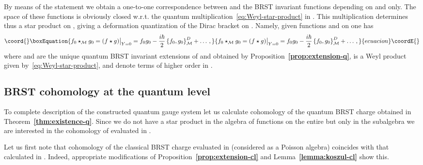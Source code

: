 \documentclass[a4paper,11pt]{amsart}
\numberwithin{thm}{section} %
\numberwithin{equation}{section} %
\numberwithin{figure}{section} %
\providecommand{\bref}[1]{{\bf \ref{#1}}}
\providecommand{\pb}[2]{\left\{{}#1{},{}#2{}\right\}}
\renewcommand{\:}{{\rm\, :\,}}
\providecommand{\func}[1]{{{\mathcal C}^\infty}{(#1)}}             %
\def\tensor{\otimes}
\def\cF{{\mathcal F}}
\def\manM{{\mathcal M}}
\def\qA{{\hat{\mathfrak A}}}
\def\E{{ \mathcal E}}
\begin{document}
By means of the statement we obtain a one-to-one correspondence
between \myHighlight{$\func{\manM}\tensor[[\hbar]]$}\coordHE{} and the BRST invariant
functions depending on \coordHE{} and \myHighlight{$\hbar$}\coordHE{} only. The space
of these functions is obviously closed w.r.t. the quantum
multiplication~\eqref{eq:Weyl-star-product} in \myHighlight{$\qA_0$}\coordHE{}. This
multiplication determines thus a star product on \myHighlight{$\manM$}\coordHE{}, giving a
deformation quantization of the Dirac bracket on \myHighlight{$\manM$}\coordHE{}.  Namely, given
functions \coordHE{} and \coordHE{} on \myHighlight{$\manM$}\coordHE{} one has
\begin{equation}\coord{}\boxEquation{
  f_0\star_{\manM} g_0=(f \star g){\bigr|}_{Y=0}=
f_0 g_0-\frac{i\hbar}{2}\pb{f_0}{g_0}^D_{\manM}+\ldots\,,
}{
  f_0\star_{\manM} g_0=(f \star g){\bigr|}_{Y=0}=
f_0 g_0-\frac{i\hbar}{2}\pb{f_0}{g_0}^D_{\manM}+\ldots\,,
}{ecuacion}\coordE{}\end{equation}
where \coordHE{} and \coordHE{} are the unique quantum
BRST invariant extensions of \coordHE{} and \coordHE{} obtained by
Proposition~\bref{prop:extension-q}, \myHighlight{$\star$}\coordHE{} is a Weyl product given
by~\eqref{eq:Weyl-star-product}, and \myHighlight{$\ldots$}\coordHE{} denote terms of higher
order in \myHighlight{$\hbar$}\coordHE{}.


\subsection{BRST cohomology at the quantum level}\label{subsec:BRST-q}
To complete description of the constructed quantum gauge system
let us calculate cohomology of the quantum BRST charge obtained in
Theorem~\bref{thm:existence-q}.  Since we do not have
a star product in the algebra \myHighlight{$\cF(\E)$}\coordHE{} of functions on
the entire \myHighlight{$\E$}\coordHE{} but only in the subalgebra \myHighlight{$\qA$}\coordHE{} we are interested
in the cohomology of \myHighlight{$\hat\Omega$}\coordHE{} evaluated in \myHighlight{$\qA$}\coordHE{}.

Let us first note that cohomology of the classical BRST charge
\myHighlight{$\Omega$}\coordHE{} evaluated in \myHighlight{$\qA$}\coordHE{} (considered as a Poisson algebra)
coincides with that calculated in \myHighlight{$\cF(\E)\tensor[[\hbar]]$}\coordHE{}. Indeed,
appropriate modifications of Proposition~\bref{prop:extension-cl} and
Lemma~\bref{lemma:koszul-cl} show this.
\end{document}
